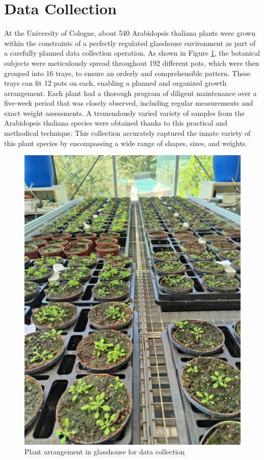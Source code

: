 \documentclass[a4paper,12pt]{report}%
\renewcommand{\\}{\vspace*{0.5\baselineskip} \newline}
\begin{document}
\section{Data Collection}
At the University of Cologne, about 540 Arabidopsis thaliana plants were grown within the constraints of a perfectly regulated glasshouse environment as part of a carefully planned data collection operation. As shown in Figure \ref{Plant arrangement in glasshouse for data collection}, the botanical subjects were meticulously spread throughout 192 different pots, which were then grouped into 16 trays, to ensure an orderly and comprehensible pattern. These trays can fit 12 pots on each, enabling a planned and organized growth arrangement.
Each plant had a thorough program of diligent maintenance over a five-week period that was closely observed, including regular measurements and exact weight assessments. A tremendously varied variety of samples from the Arabidopsis thaliana species were obtained thanks to this practical and methodical technique. This collection accurately captured the innate variety of this plant species by encompassing a wide range of shapes, sizes, and weights.

\begin{figure}[h]
\centering
	\includegraphics[scale=1.0]{images/data collection.png}\\
	\begin{footnotesize}
		\caption{Plant arrangement in glasshouse for data collection}
		\label{Plant arrangement in glasshouse for data collection}
	\end{footnotesize}
\end{figure}
\end{document}
